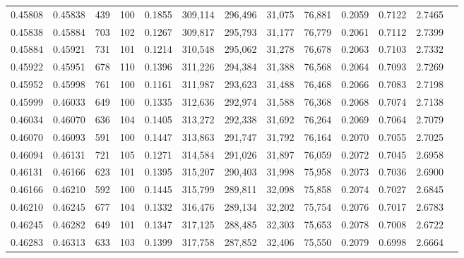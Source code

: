 \begin{tabular}{rrrrrrrrrrrrr}
0.45808 & 0.45838 &   439 & 100 &                                     0.1855 & 309,114 & 296,496 &  31,075 &  76,881 & 0.2059 & 0.7122 & 2.7465 \\
0.45838 & 0.45884 &   703 & 102 &                                     0.1267 & 309,817 & 295,793 &  31,177 &  76,779 & 0.2061 & 0.7112 & 2.7399 \\
0.45884 & 0.45921 &   731 & 101 &                                     0.1214 & 310,548 & 295,062 &  31,278 &  76,678 & 0.2063 & 0.7103 & 2.7332 \\
0.45922 & 0.45951 &   678 & 110 &                                     0.1396 & 311,226 & 294,384 &  31,388 &  76,568 & 0.2064 & 0.7093 & 2.7269 \\
0.45952 & 0.45998 &   761 & 100 &                                     0.1161 & 311,987 & 293,623 &  31,488 &  76,468 & 0.2066 & 0.7083 & 2.7198 \\
0.45999 & 0.46033 &   649 & 100 &                                     0.1335 & 312,636 & 292,974 &  31,588 &  76,368 & 0.2068 & 0.7074 & 2.7138 \\
0.46034 & 0.46070 &   636 & 104 &                                     0.1405 & 313,272 & 292,338 &  31,692 &  76,264 & 0.2069 & 0.7064 & 2.7079 \\
0.46070 & 0.46093 &   591 & 100 &                                     0.1447 & 313,863 & 291,747 &  31,792 &  76,164 & 0.2070 & 0.7055 & 2.7025 \\
0.46094 & 0.46131 &   721 & 105 &                                     0.1271 & 314,584 & 291,026 &  31,897 &  76,059 & 0.2072 & 0.7045 & 2.6958 \\
0.46131 & 0.46166 &   623 & 101 &                                     0.1395 & 315,207 & 290,403 &  31,998 &  75,958 & 0.2073 & 0.7036 & 2.6900 \\
0.46166 & 0.46210 &   592 & 100 &                                     0.1445 & 315,799 & 289,811 &  32,098 &  75,858 & 0.2074 & 0.7027 & 2.6845 \\
0.46210 & 0.46245 &   677 & 104 &                                     0.1332 & 316,476 & 289,134 &  32,202 &  75,754 & 0.2076 & 0.7017 & 2.6783 \\
0.46245 & 0.46282 &   649 & 101 &                                     0.1347 & 317,125 & 288,485 &  32,303 &  75,653 & 0.2078 & 0.7008 & 2.6722 \\
0.46283 & 0.46313 &   633 & 103 &                                     0.1399 & 317,758 & 287,852 &  32,406 &  75,550 & 0.2079 & 0.6998 & 2.6664 \\

\end{tabular}
